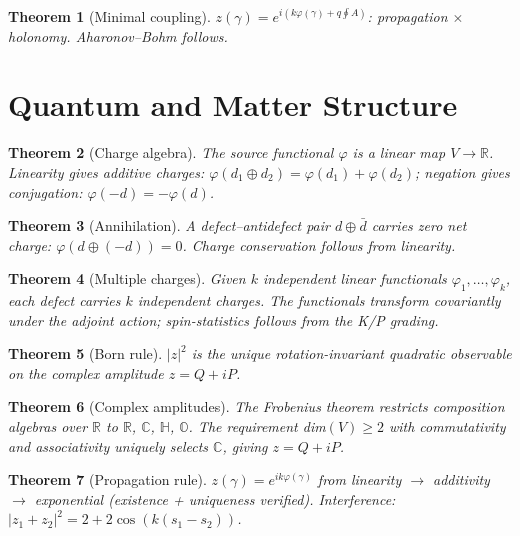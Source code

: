 \documentclass[12pt,a4paper]{article}
\newtheorem{theorem}{Theorem}
\begin{document}
\begin{theorem}[Minimal coupling]
\label{thm:minimal_coupling}
$z(\gamma) = e^{i(k\varphi(\gamma) + q \oint A)}$: propagation $\times$ holonomy. Aharonov--Bohm follows.
\end{theorem}

\section{Quantum and Matter Structure}
\label{sec:quantum}

\begin{theorem}[Charge algebra]
\label{thm:charge}
The source functional $\varphi$ is a linear map $V \to \mathbb{R}$. Linearity gives additive charges: $\varphi(d_1 \oplus d_2) = \varphi(d_1) + \varphi(d_2)$; negation gives conjugation: $\varphi(-d) = -\varphi(d)$.
\end{theorem}

\begin{theorem}[Annihilation]
\label{thm:annihilation}
A defect--antidefect pair $d \oplus \bar{d}$ carries zero net charge: $\varphi(d \oplus (-d)) = 0$. Charge conservation follows from linearity.
\end{theorem}

\begin{theorem}[Multiple charges]
\label{thm:multiple}
Given $k$ independent linear functionals $\varphi_1, \ldots, \varphi_k$, each defect carries $k$ independent charges. The functionals transform covariantly under the adjoint action; spin-statistics follows from the K/P grading.
\end{theorem}

\begin{theorem}[Born rule]
\label{thm:born_unique}
$|z|^2$ is the unique rotation-invariant quadratic observable on the complex amplitude $z = Q + iP$.
\end{theorem}

\begin{theorem}[Complex amplitudes]
\label{thm:complex}
The Frobenius theorem restricts composition algebras over $\mathbb{R}$ to $\mathbb{R}$, $\mathbb{C}$, $\mathbb{H}$, $\mathbb{O}$. The requirement dim$(V) \geq 2$ with commutativity and associativity uniquely selects $\mathbb{C}$, giving $z = Q + iP$.
\end{theorem}

\begin{theorem}[Propagation rule]
\label{thm:propagation}
$z(\gamma) = e^{ik\varphi(\gamma)}$ from linearity $\to$ additivity $\to$ exponential (existence + uniqueness verified). Interference: $|z_1 + z_2|^2 = 2 + 2\cos(k(s_1 - s_2))$.
\end{theorem}
\end{document}
